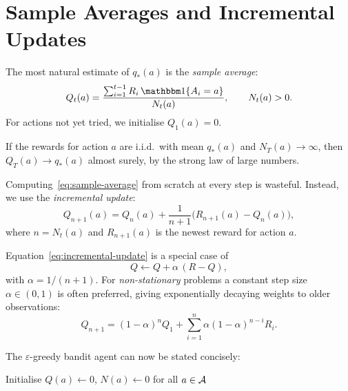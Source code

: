 \section{Sample Averages and Incremental Updates}
\label{sec:incremental}

The most natural estimate of $q_*(a)$ is the \emph{sample average}:
\begin{equation}
\label{eq:sample-average}
Q_t(a) = \frac{\sum_{i=1}^{t-1}R_i\,\ind\{A_i=a\}}{N_t(a)}, \qquad N_t(a)>0.
\end{equation}
For actions not yet tried, we initialise $Q_1(a)=0$.

\begin{proposition}
If the rewards for action $a$ are i.i.d.\ with mean $q_*(a)$ and $N_T(a)\to\infty$, then $Q_T(a)\to q_*(a)$ almost surely, by the strong law of large numbers.
\end{proposition}

Computing~\eqref{eq:sample-average} from scratch at every step is wasteful.  Instead, we use the \emph{incremental update}:
\begin{equation}
\label{eq:incremental-update}
Q_{n+1}(a) = Q_n(a) + \frac{1}{n+1}\bigl(R_{n+1}(a) - Q_n(a)\bigr),
\end{equation}
where $n=N_t(a)$ and $R_{n+1}(a)$ is the newest reward for action $a$.

\begin{remark}
\label{rem:general-update}
Equation~\eqref{eq:incremental-update} is a special case of
\begin{equation}
\label{eq:general-update}
Q \leftarrow Q + \alpha\,(R - Q),
\end{equation}
with $\alpha=1/(n+1)$.  For \emph{non-stationary} problems a constant step size $\alpha\in(0,1)$ is often preferred, giving exponentially decaying weights to older observations:
\[
Q_{n+1} = (1-\alpha)^n Q_1 + \sum_{i=1}^{n}\alpha(1-\alpha)^{n-i}R_i.
\]
\end{remark}

The $\varepsilon$-greedy bandit agent can now be stated concisely:

\begin{algorithm}[ht]
\caption{$\varepsilon$-Greedy Bandit Agent}
\label{alg:eps-greedy}
Initialise $Q(a)\leftarrow 0$, $N(a)\leftarrow 0$ for all $a\in\mathcal{A}$\;
\end{algorithm}


